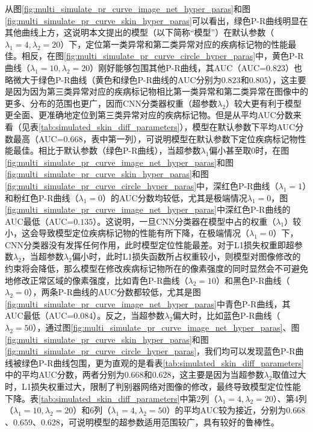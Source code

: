 从图\ref{fig:multi_simulate_pr_curve_image_net_hyper_paras}和图\ref{fig:multi_simulate_pr_curve_skin_hyper_paras}可以看出，绿色P-R曲线明显在其他曲线上方，这说明本文提出的模型（以下简称“模型”）在默认参数（$\lambda_{1}=4,\lambda_{2}=20$）下，定位第一类异常和第二类异常对应的疾病标记物的性能最佳。相反，在图\ref{fig:multi_simulate_pr_curve_circle_hyper_paras}中，黄色P-R曲线（$\lambda_{1}=10,\lambda_{2}=20$）刚好能够包围其他P-R曲线，其AUC（AUC=$0.823$）也略微大于绿色P-R曲线（黄色和绿色P-R曲线的AUC分别为$0.823$和$0.805$），这主要是因为因为第三类异常对应的疾病标记物相比第一类异常和第二类异常在图像中的更多、分布的范围也更广，因而CNN分类器权重（超参数$\lambda_{2}$）较大更有利于模型更全面、更准确地定位到第三类异常对应的疾病标记物。但是从平均AUC分数来看（见表\ref{tab:simulated_skin_diff_parameters}），模型在默认参数下平均AUC分数最高（AUC=$0.668$，表中第一列），可说明模型在默认参数下定位疾病标记物性能最佳。相比于默认参数（绿色P-R曲线），当超参数$\lambda_{1}$偏小甚至取$0$时，在图\ref{fig:multi_simulate_pr_curve_image_net_hyper_paras}和图\ref{fig:multi_simulate_pr_curve_skin_hyper_paras}和图\ref{fig:multi_simulate_pr_curve_circle_hyper_paras}中，深红色P-R曲线（$\lambda_{1}=1$）和粉红色P-R曲线（$\lambda_{1}=0$）的AUC分数均较低，尤其是极端情况$\lambda_{1}=0$，图\ref{fig:multi_simulate_pr_curve_image_net_hyper_paras}中深红色P-R曲线的AUC最低（AUC=$0.135$）。这说明，一旦CNN分类器在模型中占的权重（$\lambda_{1}$）较小，这会导致模型定位疾病标记物的性能有所下降，在极端情况（$\lambda_{1}=0$）下，CNN分类器没有发挥任何作用，此时模型定位性能最差。对于L1损失权重即超参数$\lambda_{2}$，当超参数$\lambda_{2}$偏小时，此时L1损失函数所占权重较小，则模型对图像修改的约束将会降低，那么模型在修改疾病标记物所在的像素强度的同时显然会不可避免地修改正常区域的像素强度，比如青色P-R曲线（$\lambda_{2}=10$）和黑色P-R曲线（$\lambda_2=0$），两条P-R曲线的AUC分数都较低，尤其是图\ref{fig:multi_simulate_pr_curve_image_net_hyper_paras}中青色P-R曲线，其AUC最低（AUC=$0.084$）。反之，当超参数$\lambda_{2}$偏大时，比如蓝色P-R曲线（$\lambda_{2}=50$），通过图\ref{fig:multi_simulate_pr_curve_image_net_hyper_paras}、图\ref{fig:multi_simulate_pr_curve_skin_hyper_paras}和图\ref{fig:multi_simulate_pr_curve_circle_hyper_paras}，我们均可以发现蓝色P-R曲线被绿色P-R曲线包围，更为直观的是看表\ref{tab:simulated_skin_diff_parameters}中的平均AUC分数，两者分别为$0.668$和$0.628$，这主要是因为当超参数$\lambda_{2}$取值过大时，L1损失权重过大，限制了判别器网络对图像的修改，最终导致模型定位性能下降。表\ref{tab:simulated_skin_diff_parameters}中第$2$列（$\lambda_{1}=4,\lambda_{2}=20$）、第$4$列（$\lambda_{1}=10,\lambda_{2}=20$）和$6$列（$\lambda_{1}=4,\lambda_{2}=50$）的平均AUC较为接近，分别为$0.668$、$0.659$、$0.628$，可说明模型的超参数适用范围较广，具有较好的鲁棒性。
